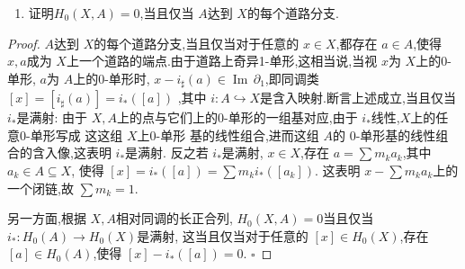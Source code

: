 \documentclass[../../几何与拓扑.tex]{subfiles}
\begin{document}
\begin{problemsec}
    
    \begin{problem}
        \begin{enumerate}
            \item 证明\(  H_0\left( X,A \right)  = 0\),当且仅当 \(  A  \)达到 \(  X  \)的每个道路分支.   
        \end{enumerate}
        
    \end{problem}
    \begin{proof}
        \(  A  \)达到 \(  X  \)的每个道路分支,当且仅当对于任意的 \(  x \in X  \),都存在 \(  a \in A  \),使得 \(  x,a  \)成为 \(  X  \)上一个道路的端点.由于道路上奇异1-单形,这相当说,当视 \(  x  \)为 \(  X  \)上的0-单形, \(  a  \)为 \(  A  \)上的0-单形时, \(  x -i_{\sharp }\left( a \right)\in \operatorname{Im}\, \partial _{1}   \),即同调类 \(  [x]= [i_{\sharp }\left( a \right) ]= i_{*}\left( [a] \right)   \)     ,其中 \(  i: A\hookrightarrow X  \)是含入映射.断言上述成立,当且仅当 \(  i_{*}  \)是满射: 由于 \(  X,A  \)上的点与它们上的0-单形的一组基对应,由于 \(  i_{*}  \)线性,\(  X  \)上的任意0-单形写成 这这组 \(  X  \)上0-单形 基的线性组合,进而这组 \(  A  \)的 \(  0  \)-单形基的线性组合的含入像,这表明 \(  i_{*}  \)是满射. 反之若 \(  i_{*}  \)是满射,   \(  x \in X  \),存在 \(  a =  \sum m_{k}a_{k}  \),其中 \(  a_{k}\in A\subseteq X  \), 使得 \(  [x]=i_{*}\left( [a] \right) = \sum m_{k}i_*\left( [a_{k}] \right) \).   这表明 \(  x- \sum m_{k}a_{k}  \)上的一个闭链,故 \(  \sum m_{k}= 1  \).  
        
        另一方面,根据 \(  X,A  \)相对同调的长正合列, \(  H_0\left( X,A \right)   = 0\)当且仅当 \(  i_{*}: H_0\left( A \right)\to H_0\left( X \right)    \)是满射,   这当且仅当对于任意的 \(  [x] \in H_0\left( X \right)   \),存在 \(  [a ] \in H_0\left( A \right)   \),使得 \(  [x]-i_{*}\left( [a] \right)= 0   \).
        \hfill $\square$
    \end{proof}
    \hspace*{\fill} 
    
\end{problemsec}
\end{document}
